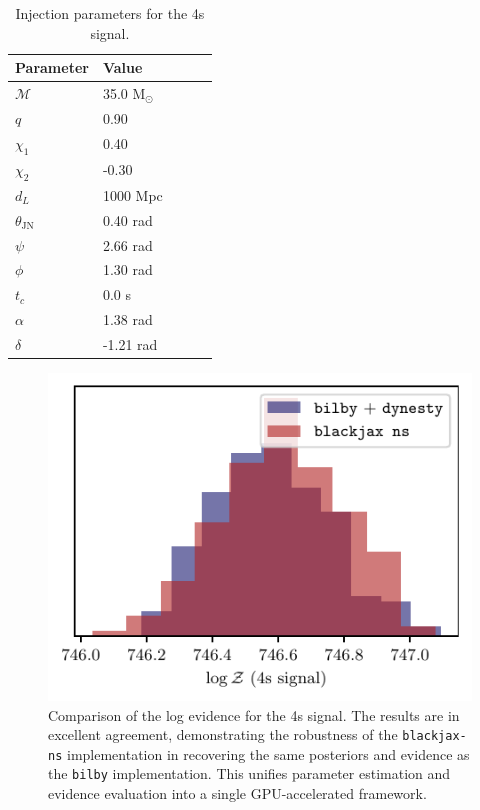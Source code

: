 \documentclass[fleqn,usenatbib]{mnras}
\begin{document}
\begin{table}
    \centering
    \caption{Injection parameters for the 4s signal.}
    \label{tab:injection_params}
    \begin{tabular}{l l l c c}
    \hline
    \hline
    \textbf{Parameter} & \textbf{Value} \\
    \hline
    $\mathcal{M}$ & 35.0 M$_{\odot}$ \\
    $q$ & 0.90 \\
    $\chi_1$ & 0.40 \\
    $\chi_2$ & -0.30 \\
    $d_L$ & 1000 Mpc \\
    $\theta_{\textrm{JN}}$ & 0.40 rad \\
    $\psi$ & 2.66 rad \\
    $\phi$ & 1.30 rad \\
    $t_c$ & 0.0 s\\
    $\alpha$ & 1.38 rad \\
    $\delta$ & -1.21 rad \\
    \hline
    \hline
    \end{tabular}
    \end{table}

\begin{figure}
    \centering
    \includegraphics{figures/4s_logZ_comparison.pdf}
    \caption{Comparison of the log evidence for the 4s signal. The results are in excellent agreement, demonstrating the
    robustness of the \texttt{blackjax-ns} implementation in recovering the same posteriors and evidence as the \texttt{bilby} implementation.
    This unifies parameter estimation and evidence evaluation into a single GPU-accelerated framework.}
    \label{fig:4s_logZ_comparison}
\end{figure}
\end{document}

